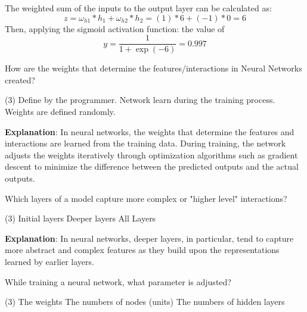 \begin{answer}
The weighted sum of the inputs to the output layer can be calculated as: 
\begin{equation}\label{eq:ex1}
  z = \omega_{h1}*h_1 + \omega_{h2}*h_2 = (1)*6 + (-1)*0 = 6
\end{equation} Then, applying the sigmoid activation function: the value of
\begin{equation}\label{eq:ex1}
  y = \frac{1}{1+\exp{(-6)}} = 0.997
\end{equation}
\end{answer}

\begin{question}
How are the weights that determine the features/interactions in Neural Networks created? 
\begin{tasks}(3) %
    \task Define by the programmer. 
    \task Network learn during the training process. 
    \task Weights are defined randomly. 
\end{tasks}
\end{question} 

\begin{answer}
\textbf{Explanation}: In neural networks, the weights that determine the features and interactions are learned from the training data. During training, the network adjusts the weights iteratively through optimization algorithms such as gradient descent to minimize the difference between the predicted outputs and the actual outputs.
\end{answer}

\begin{question}
Which layers of a model capture more complex or "higher level" interactions?
\begin{tasks}(3) 
    \task Initial layers
    \task Deeper layers
    \task All Layers
\end{tasks}
\end{question} 

\begin{answer}
\textbf{Explanation}: In neural networks, deeper layers, in particular, tend to capture more abstract and complex features as they build upon the representations learned by earlier layers.
\end{answer}


\begin{question}
While training a neural network, what parameter is adjusted? 
\begin{tasks}(3) 
    \task The weights
    \task The numbers of nodes (units)
    \task The numbers of hidden layers 
\end{tasks}
\end{question} 

